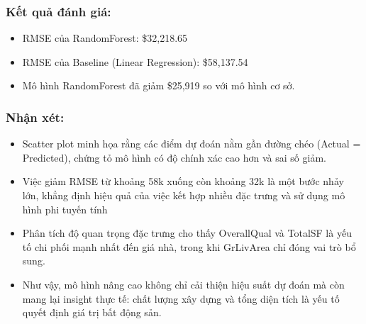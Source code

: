 \subsubsection{Kết quả đánh giá:}
\begin{itemize}
  \item[-] RMSE của RandomForest: \$32,218.65
  \item[-] RMSE của Baseline (Linear Regression): \$58,137.54
  \item[-] Mô hình RandomForest đã giảm \$25,919 so với mô hình cơ sở.
\end{itemize}
\subsubsection{Nhận xét:}
\begin{itemize}
  \item[-] Scatter plot minh họa rằng các điểm dự đoán nằm gần đường chéo (Actual = Predicted), chứng tỏ mô hình có độ chính xác cao hơn và sai số giảm.
  \item[-] Việc giảm RMSE từ khoảng 58k xuống  còn khoảng 32k là một bước nhảy lớn, khẳng định hiệu quả của việc kết hợp nhiều đặc trưng và sử dụng mô hình phi tuyến tính
  \item[-] Phân tích độ quan trọng đặc trưng cho thấy OverallQual và TotalSF là yếu tố chi phối mạnh nhất đến giá nhà, trong khi GrLivArea chỉ đóng vai trò bổ sung.
  \item[-] Như vậy, mô hình nâng cao không chỉ cải thiện hiệu suất dự đoán mà còn mang lại insight thực tế: chất lượng xây dựng và tổng diện tích là yếu tố quyết định giá trị bất động sản.
\end{itemize}

